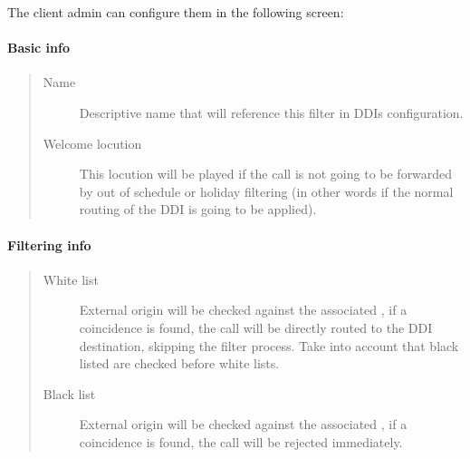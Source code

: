 \documentclass[letterpaper,10pt,spanish]{sphinxmanual}
\begin{document}
The client admin can configure them in the following screen:


\paragraph{Basic info}
\label{administration_portal/client/vpbx/routing_tools/external_call_filters:basic-info}\begin{quote}
\begin{description}
\item[{Name}] \leavevmode
Descriptive name that will reference this filter in DDIs configuration.

\item[{Welcome locution}] \leavevmode
This locution will be played if the call is not going to be
forwarded by out of schedule or holiday filtering (in other words if
the normal routing of the DDI is going to be applied).

\end{description}
\end{quote}


\paragraph{Filtering info}
\label{administration_portal/client/vpbx/routing_tools/external_call_filters:filtering-info}\begin{quote}
\begin{description}
\item[{White list}] \leavevmode
External origin will be checked against the associated {\hyperref[administration_portal/client/vpbx/routing_tools/match_lists:match\string-lists]{}},
if a coincidence is found, the call will be directly routed to the DDI
destination, skipping the filter process. Take into account that black
listed are checked before white lists.

\item[{Black list}] \leavevmode
External origin will be checked against the associated {\hyperref[administration_portal/client/vpbx/routing_tools/match_lists:match\string-lists]{}},
if a coincidence is found, the call will be rejected immediately.

\end{description}
\end{quote}
\end{document}
